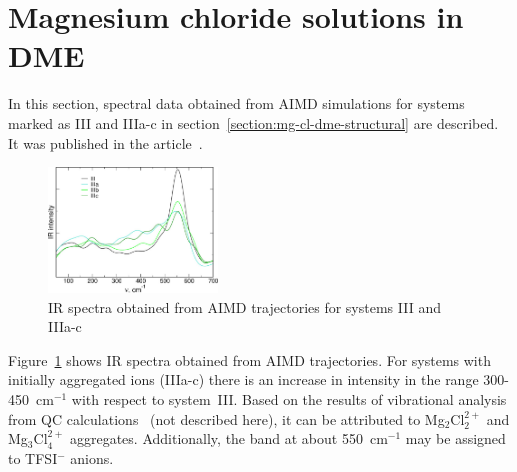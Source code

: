 \section{Magnesium chloride solutions in DME}

In this section, spectral data obtained from AIMD simulations for systems marked as III and IIIa-c in section~\ref{section:mg-cl-dme-structural} are described. It was published in the article~\cite{mg-cl-dme}.

\begin{figure}[ht]
    \centering
    \includegraphics[width=0.4\textwidth]{img/4-ir-spectra-from-aimd-simulations/2-mg-cl-dme/ir-aimd.png}
    \caption{IR spectra obtained from AIMD trajectories for systems III and IIIa-c}
    \label{fig:mg-cl-dme-ir-aimd}
\end{figure}

Figure~\ref{fig:mg-cl-dme-ir-aimd} shows IR spectra obtained from AIMD trajectories. For systems with initially aggregated ions (IIIa-c) there is an increase in intensity in the range 300-450~cm$^{-1}$ with respect to system~III. Based on the results of vibrational analysis from QC calculations~\cite{mg-cl-dme} (not described here), it can be attributed to Mg$_2$Cl$_2^{2+}$ and Mg$_3$Cl$_4^{2+}$ aggregates. Additionally, the band at about 550~cm$^{-1}$ may be assigned to TFSI$^{-}$ anions.

